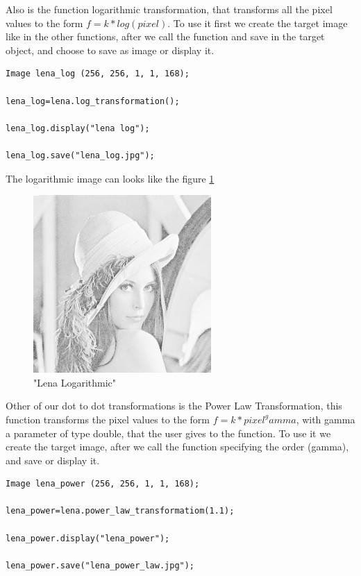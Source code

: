 \documentclass[a4paper]{article}
\begin{document}
Also is the function logarithmic transformation, that transforms all the pixel values to the form $f=k*log(pixel)$. To use it first we create the target image like in the other functions, after we call the function and save in the target object, and choose to save as image or display it.

\begin{lstlisting}
Image lena_log (256, 256, 1, 1, 168);
	
lena_log=lena.log_transformation();

lena_log.display("lena log");
    
lena_log.save("lena_log.jpg");
\end{lstlisting}

The logarithmic image can looks like the figure 
\ref{lena_log}

\begin{figure}[H]

\centering
\includegraphics[scale=0.5]{./.Multimedia/lena_log.jpg}

\caption{"Lena Logarithmic"}
\label{lena_log}
\end{figure}

Other of our dot to dot transformations is the Power Law Transformation, this function transforms the pixel values to the form $f=k*pixel^gamma$, with gamma a parameter of type double, that the user gives to the function. To use it we create the target image, after we call the function specifying the order (gamma), and save or display it.

\begin{lstlisting}
Image lena_power (256, 256, 1, 1, 168);
	
lena_power=lena.power_law_transformatiom(1.1);
    
lena_power.display("lena_power");
    
lena_power.save("lena_power_law.jpg");
\end{lstlisting}
\end{document}
